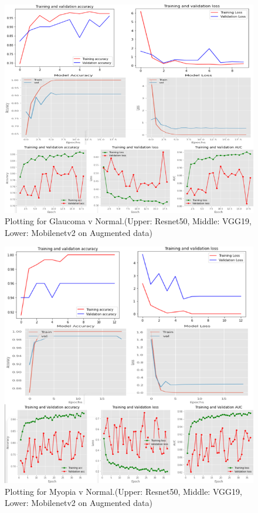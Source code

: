 \begin{figure}[H]
    \centering
    \includegraphics[scale=0.7]{c2.png}
    \caption{Plotting for Glaucoma v Normal.(Upper: Resnet50, Middle: VGG19, Lower: Mobilenetv2 on Augmented data)}
    \label{Plotting for Glaucoma v Normal}
\end{figure}
\vspace{5pt}

\begin{figure}[H]
    \centering
    \includegraphics[scale=0.7]{c3.png}
    \caption{Plotting for Myopia v Normal.(Upper: Resnet50, Middle: VGG19, Lower: Mobilenetv2 on Augmented data)}
    \label{Plotting for Myopia v Normal}
\end{figure}
\vspace{5pt}

